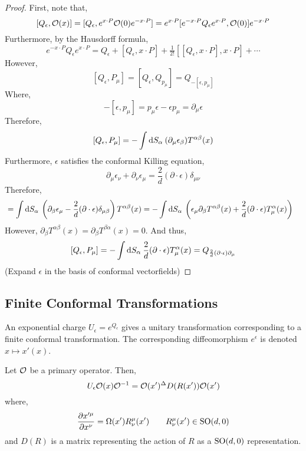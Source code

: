 \documentclass[12pt]{extarticle}
\begin{document}
\begin{proof}
First, note that,
\[ [Q_\epsilon, \mathcal{O}(x)] = [Q_{\epsilon}, e^{x \cdot P} \mathcal{O}(0) e^{-x \cdot P}] = e^{x \cdot P} [e^{-x \cdot P} Q_\epsilon e^{x \cdot P}, \mathcal{O}(0)] e^{-x \cdot P} \]
Furthermore, by the Hausdorff formula,
\[ e^{-x \cdot P} Q_\epsilon e^{x \cdot P} = Q_\epsilon + [Q_\epsilon, x \cdot P] + \tfrac{1}{2!} [[Q_\epsilon, x \cdot P], x \cdot P] + \cdots \]
However,
\[ [Q_{\epsilon}, P_\mu] = [Q_{\epsilon}, Q_{p_\mu}] = Q_{-[\epsilon, p_\mu]}  \] 
Where,
\[ -[\epsilon, p_\mu] = p_\mu \epsilon - \epsilon p_\mu = \partial_\mu \epsilon \]
Therefore,
\[ [Q_\epsilon, P_\mu] = - \int \mathrm{d}S_\alpha \: (\partial_\mu \epsilon_\beta) T^{\alpha \beta}(x)  \]
Furthermore, $\epsilon$ satisfies the conformal Killing equation,
\[ \partial_\mu \epsilon_\nu + \partial_\nu \epsilon_\mu = \frac{2}{d} (\partial \cdot \epsilon) \delta_{\mu \nu} \]
Therefore,
\begin{align*}
[Q_\epsilon, P_\mu] & = \int \d{S_\alpha} \left (\partial_\beta \epsilon_\mu - \frac{2}{d} (\partial \cdot \epsilon) \delta_{\mu \beta} \right) T^{\alpha \beta}(x) = - \int \d{S_\alpha} \left (\epsilon_\mu \partial_\beta T^{\alpha \beta}(x) + \frac{2}{d} (\partial \cdot \epsilon) T^{\alpha} _{\mu}(x) \right)
\end{align*}
However, $\partial_\beta T^{\alpha \beta}(x) = \partial_\beta T^{\beta \alpha}(x) = 0$. And thus,
\[ [Q_\epsilon, P_\mu] = - \int \mathrm{d}S_\alpha \:  \frac{2}{d} (\partial \cdot \epsilon) T^{\alpha}_{\mu}(x)  = Q_{\frac{2}{d} (\partial \cdot \epsilon) \partial_\mu} \]
(Expand $\epsilon$ in the basis of conformal vectorfields)
\end{proof}

\subsection{Finite Conformal Transformations}

An exponential charge $U_\epsilon = e^{Q_{\epsilon}}$ gives a unitary transformation corresponding to a finite conformal transformation. The corresponding diffeomorphism $e^{\epsilon}$ is denoted $x \mapsto x'(x)$. 
\begin{theorem}
Let $\mathcal{O}$ be a primary operator. Then,
\[ U_\epsilon \mathcal{O}(x) \mathcal{O}^{-1} = \mathcal{O}(x')^\Delta D(R(x')) \mathcal{O}(x') \]
where,
\[ \frac{\partial{x'^\mu}}{\partial{x^\nu}} = \Omega(x') R^\mu_\nu(x') \quad \quad R^{\mu}_{\nu}(x') \in \mathrm{SO}(d, 0) \]
and $D(R)$ is a matrix representing the action of $R$ as a $\mathrm{SO}(d, 0)$ representation. 
\end{theorem}
\end{document}
